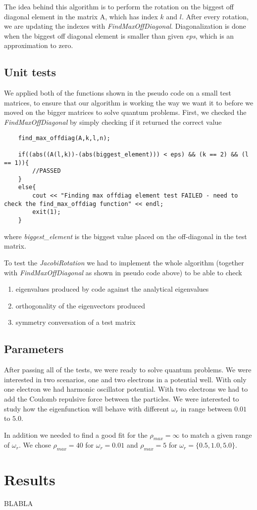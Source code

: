 \documentclass[a4paper, 10pt]{article}
\begin{document}
The idea behind this algorithm is to perform the rotation on the biggest off
diagonal element in the matrix A, which has index \(k\) and \(l\). After every
rotation, we are updating the indexes with \textit{FindMaxOffDiagonal}.
Diagonalization is done when the biggest off diagonal element is smaller than
given \textit{eps}, which is an approximation to  zero.

\subsection{Unit tests}
We applied both of the functions shown in the pseudo code on a
small test matrices, to ensure that our algorithm is working the way we want it
to before we moved on the bigger matrices to solve quantum problems.
First, we checked the \textit{FindMaxOffDiagonal} by simply checking if it
returned the correct value
\begin{lstlisting}
	find_max_offdiag(A,k,l,n);

    if((abs((A(l,k))-(abs(biggest_element))) < eps) && (k == 2) && (l == 1)){
        //PASSED
    }
    else{
        cout << "Finding max offdiag element test FAILED - need to check the find_max_offdiag function" << endl;
        exit(1);
    }
\end{lstlisting}

where \textit{biggest\_element} is the biggest value placed on the off-diagonal
in the test matrix.

To test the \textit{JacobiRotation} we had to implement the whole algorithm
(together with \textit{FindMaxOffDiagonal} as shown in pseudo code above) to be able to check

\begin{enumerate}
\item eigenvalues produced by code against the analytical eigenvalues \\
\item orthogonality of the eigenvectors produced \\
\item symmetry conversation of a test matrix
\end{enumerate}

\subsection{Parameters}
After passing all of the tests, we were ready to solve quantum problems. We
were interested in two scenarios, one and  two electrons in a potential well.
With only one electron we had harmonic oscillator potential. With two electrons
we had to add the Coulomb repulsive force between the particles. We were
interested to study how the eigenfunction will behave with different
\(\omega_{r}\) in range between \(0.01\) to \(5.0\).

In addition we needed to find a good fit for the \(\rho_{max}=\infty\) to match
a given range of \(\omega_{r}\). We chose \(\rho_{max} = 40\) for \(\omega_{r}
= 0.01\) and \(\rho_{max}= 5\) for \(\omega_{r} = \{0.5, 1.0, 5.0\}\).
\section{Results}
BLABLA
\end{document}
